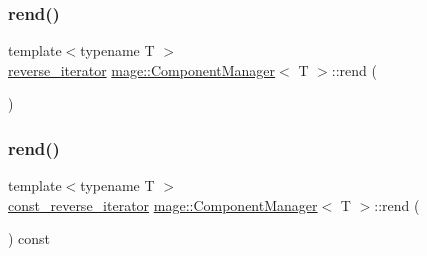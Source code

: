 \mbox{\label{classmage_1_1_component_manager_a6e726758abf9820cdc48223bc31e48b5}} 
\subsubsection{\texorpdfstring{rend()}{rend()}\hspace{0.1cm}{\footnotesize\ttfamily [1/2]}}
{\footnotesize\ttfamily template$<$typename T $>$ \\
\mbox{\hyperlink{classmage_1_1_component_manager_a33e3e4994e4ec77e3ab587d68dbb8277}{reverse\+\_\+iterator}} \mbox{\hyperlink{classmage_1_1_component_manager}{mage\+::\+Component\+Manager}}$<$ T $>$\+::rend (\begin{DoxyParamCaption}{ }\end{DoxyParamCaption})\hspace{0.3cm}{\ttfamily [noexcept]}}

\mbox{\label{classmage_1_1_component_manager_a5a9937ca77be59c37762e91d444a0d72}} 
\subsubsection{\texorpdfstring{rend()}{rend()}\hspace{0.1cm}{\footnotesize\ttfamily [2/2]}}
{\footnotesize\ttfamily template$<$typename T $>$ \\
\mbox{\hyperlink{classmage_1_1_component_manager_a00481d8beab5d950124f54c0f832da53}{const\+\_\+reverse\+\_\+iterator}} \mbox{\hyperlink{classmage_1_1_component_manager}{mage\+::\+Component\+Manager}}$<$ T $>$\+::rend (\begin{DoxyParamCaption}{ }\end{DoxyParamCaption}) const\hspace{0.3cm}{\ttfamily [noexcept]}}

\mbox{\label{classmage_1_1_component_manager_a836cb7e3e2e901d5bf2d219b2b4119c6}} 
